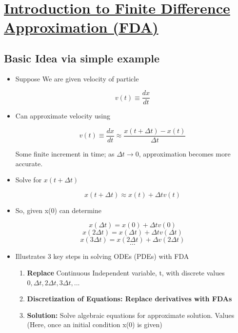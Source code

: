 \def \secname {Introduction to Finite Difference Approximation (FDA)}

\section[\secname]{\hyperlink{toc}{\secname}}


\subsection{Basic Idea via simple example}
\begin{itemize}
    \item Suppose We are given velocity of particle

    \[ v(t) \equiv \frac{dx}{dt}\]

    \item  Can approximate velocity using 

    \[ v(t) \equiv \frac{dx}{dt} \approx \frac{x(t+\Delta t) - x(t)}{\Delta t}\]

    Some finite increment in time; as $\Delta t \rightarrow 0$, approximation becomes more accurate.

    \item Solve for $x(t+\Delta t)$

    \[ x(t+ \Delta t) \approx x(t) + \Delta t v(t) \]

    \item So, given x(0) can determine

    \[ x(\Delta t) = x(0) + \Delta t v(0)\]
    \[  x(2 \Delta t) =  x(\Delta t) + \Delta t v(\Delta t)\]
    \[  x(3 \Delta t) =  x(2 \Delta t) + \Delta v(2 \Delta t)\] \[...\]

    \item Illustrates 3 key steps in solving ODEs (PDEs) with FDA

    \begin{enumerate}
        \item \textbf{Replace} Continuous Independent variable, t, with discrete values $0,\Delta t, 2\Delta t, 3\Delta t, ...$
        \item \textbf{Discretization of Equations: Replace derivatives with FDAs}
        \item \textbf{Solution:} Solve algebraic equations for approximate solution. Values (Here, once an initial condition x(0) is given)
    \end{enumerate}
\end{itemize}

